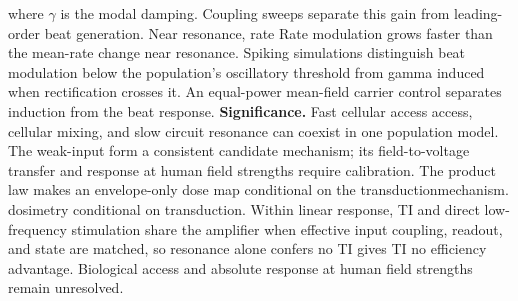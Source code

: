 \documentclass[11pt,a4paper]{article}
\providecommand{\DIFaddtex}[1]{{\protect\color{blue} \sf #1}} %
\providecommand{\DIFdeltex}[1]{{\protect\color{red} \scriptsize #1}} %
\providecommand{\DIFaddbegin}{} %
\providecommand{\DIFaddend}{} %
\providecommand{\DIFdelbegin}{} %
\providecommand{\DIFdelend}{} %
\providecommand{\DIFadd}[1]{\texorpdfstring{\DIFaddtex{#1}}{#1}} %
\providecommand{\DIFdel}[1]{\texorpdfstring{\DIFdeltex{#1}}{}} %
\begin{document}
where $\gamma$ is \DIFdelbegin \DIFdel{the }\DIFdelend modal damping. Coupling sweeps separate this gain from leading-order
beat generation. \DIFdelbegin \DIFdel{Near resonance, rate }\DIFdelend \DIFaddbegin \DIFadd{Rate }\DIFaddend modulation grows faster than the mean-rate change \DIFaddbegin \DIFadd{near resonance}\DIFaddend .
Spiking simulations distinguish beat modulation below the \DIFdelbegin \DIFdel{population's }\DIFdelend oscillatory threshold from
gamma induced when rectification crosses it. An equal-power mean-field carrier
control separates induction from the beat response.
\textbf{Significance.} Fast \DIFdelbegin \DIFdel{cellular access}\DIFdelend \DIFaddbegin \DIFadd{access, cellular mixing, }\DIFaddend and slow circuit resonance \DIFdelbegin \DIFdel{can coexist in
one population model. The weak-input }\DIFdelend \DIFaddbegin \DIFadd{form
a consistent candidate mechanism; its field-to-voltage transfer and response at
human field strengths require calibration. The }\DIFaddend product law makes \DIFdelbegin \DIFdel{an }\DIFdelend envelope-only
\DIFdelbegin \DIFdel{dose map
conditional on the transductionmechanism. }\DIFdelend \DIFaddbegin \DIFadd{dosimetry conditional on transduction. Within linear response, }\DIFaddend TI and direct
low-frequency stimulation share the amplifier when \DIFdelbegin \DIFdel{effective input }\DIFdelend coupling, readout, and state
are matched, so resonance alone \DIFdelbegin \DIFdel{confers no TI }\DIFdelend \DIFaddbegin \DIFadd{gives TI no }\DIFaddend efficiency advantage.
\DIFdelbegin \DIFdel{Biological access and absolute
response at human field strengths remain unresolved.
}\DIFdelend
\end{document}
